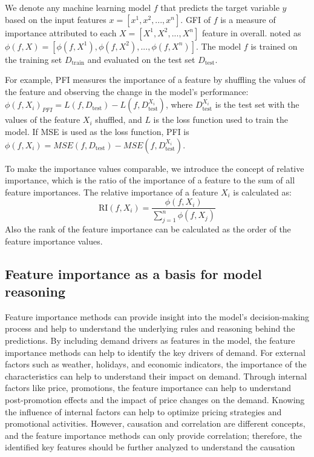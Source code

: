 We denote any machine learning model $f$ that predicts the target variable $y$ based on the input features $x = [x^1, x^2, ..., x^n]$.
GFI of $f$ is a measure of importance attributed to each $X=[X^1, X^2, ..., X^n]$ feature in overall.
noted as $ \phi( f, X) = [ \phi( f, X^1), \phi( f, X^2), ..., \phi( f, X^n)]$.
The model $f$ is trained on the training set $D_{\text{train}}$ and evaluated on the test set $D_{\text{test}}$.

For example, PFI measures the importance of a feature by shuffling the values of the feature and observing the change in the model's performance:
$\phi(f, X_i)_{PFI} = L(f, D_{\text{test}}) - L(f, D_{\text{test}}^{X_i})$,
where $D_{\text{test}}^{X_i}$ is the test set with the values of the feature $X_i$ shuffled, and $L$ is the loss function used to train the model.
If MSE is used as the loss function, PFI is $\phi(f, X_i) = MSE(f, D_{\text{test}}) - MSE(f, D_{\text{test}}^{X_i})$.

To make the importance values comparable, we introduce the concept of relative importance, which is the ratio of the importance of a feature to the sum of all feature importances.
The relative importance of a feature $X_i$ is calculated as:
$$
\text{RI}(f, X_i) = \frac{\phi(f, X_i)}{\sum_{j=1}^{n} \phi(f, X_j)}
$$
Also the rank of the feature importance can be calculated as the order of the feature importance values.




\subsection{Feature importance as a basis for model reasoning}\label{subsec:feature-importance-as-basis-for-model-reasoning}
Feature importance methods can provide insight into the model's decision-making process and help to understand the underlying rules and reasoning behind the predictions.
By including demand drivers as features in the model, the feature importance methods can help to identify the key drivers of demand.
For external factors such as weather, holidays, and economic indicators, the importance of the characteristics can help to understand their impact on demand.
Through internal factors like price, promotions, the feature importance can help to understand post-promotion effects and the impact of price changes on the demand\cite{vandeput2023demand}.
Knowing the influence of internal factors can help to optimize pricing strategies and promotional activities.
However, causation and correlation are different concepts, and the feature importance methods can only provide correlation;
therefore, the identified key features should be further analyzed to understand the causation\cite{Breiman2001}





